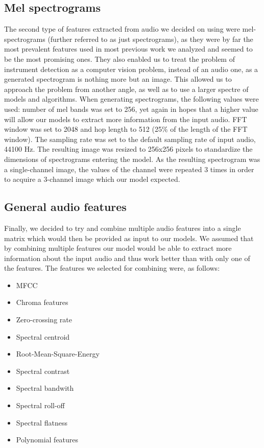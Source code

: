 \subsection{Mel spectrograms}

The second type of features extracted from audio we decided on using were mel-spectrograms (further referred to as just spectrograms), as they were by far the most prevalent features used in most previous work we analyzed and seemed to be the most promising ones. They also enabled us to treat the problem of instrument detection as a computer vision problem, instead of an audio one, as a generated spectrogram is nothing more but an image. This allowed us to approach the problem from another angle, as well as to use a larger spectre of models and algorithms. When generating spectrograms, the following values were used:
number of mel bands was set to 256, yet again in hopes that a higher value will allow our models to extract more information from the input audio. FFT window was set to 2048 and hop length to 512 (25\% of the length of the FFT window). The sampling rate was set to the default sampling rate of input audio, 44100 Hz. The resulting image was resized to 256x256 pixels to standardize the dimensions of spectrograms entering the model. As the resulting spectrogram was a single-channel image, the values of the channel were repeated 3 times in order to acquire a 3-channel image which our model expected.

\subsection{General audio features}

Finally, we decided to try and combine multiple audio features into a single matrix which would then be provided as input to our models. We assumed that by combining multiple features our model would be able to extract more information about the input audio and thus work better than with only one of the features. The features we selected for combining were, as follows:

\begin{itemize}
    \item MFCC
    \item Chroma features
    \item Zero-crossing rate
    \item Spectral centroid 
    \item Root-Mean-Square-Energy
    \item Spectral contrast
    \item Spectral bandwith
    \item Spectral roll-off
    \item Spectral flatness
    \item Polynomial features
\end{itemize}

